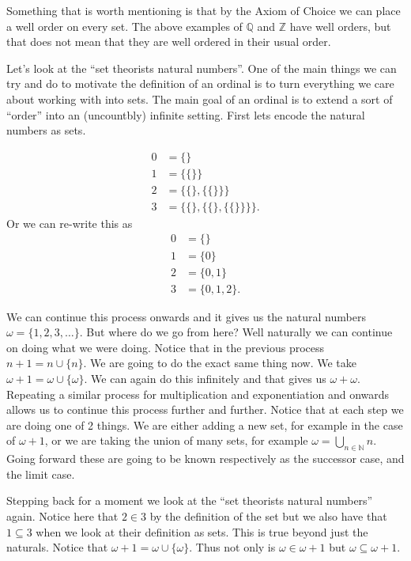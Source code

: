 \begin{remark}
  Something that is worth mentioning is that by the Axiom of Choice we can
  place a well order on every set. The above examples of $\mathbb{Q}$ and
  $\mathbb{Z}$ have well orders, but that does not mean that they are well
  ordered in their usual order.
\end{remark}

Let's look at the ``set theorists natural numbers''. One of the main things we
can try and do to motivate the definition of an ordinal is to turn everything
we care about working with into sets. The main goal of an ordinal is to
extend a sort of ``order'' into an (uncountbly) infinite setting. First lets
encode the natural numbers as sets.

\begin{align*}
  0 &= \{\} \\
  1 &= \{\{\}\} \\
  2 &= \{\{\}, \{\{\}\}\} \\
  3 &= \{\{\}, \{\{\}, \{\{\} \}\}\} 
.\end{align*}
Or we can re-write this as
\begin{align*}
  0 &= \{\} \\
  1 &= \{0\} \\
  2 &= \{0,1\} \\
  3 &= \{0,1,2\} 
.\end{align*}

We can continue this process onwards and it gives us the natural numbers
$\omega = \{1, 2, 3, \ldots\}$. But where do we go from here? Well naturally we
can continue on doing what we were doing. Notice that in the previous process
$n + 1 = n \cup \{n\}$. We are going to do the exact same thing now. We take
$\omega + 1 = \omega \cup \{\omega\}$. We can again do this infinitely and that
gives us $\omega + \omega$. Repeating a similar process for multiplication and
exponentiation and onwards allows us to continue this process further and
further. Notice that at each step we are doing one of 2 things. We are either
adding a new set, for example in the case of $\omega + 1$, or we are taking the
union of many sets, for example $\omega = \bigcup_{n \in \mathbb{N}} n$. Going
forward these are going to be known respectively as the successor case, and the
limit case. 

Stepping back for a moment we look at the ``set theorists natural numbers''
again. Notice here that $2 \in 3$ by the definition of the set but we also have
that $1 \subseteq 3$ when we look at their definition as sets. This is true
beyond just the naturals. Notice that $\omega + 1 = \omega \cup \{\omega\}$.
Thus not only is $\omega \in \omega + 1$ but $\omega \subseteq \omega + 1$.


